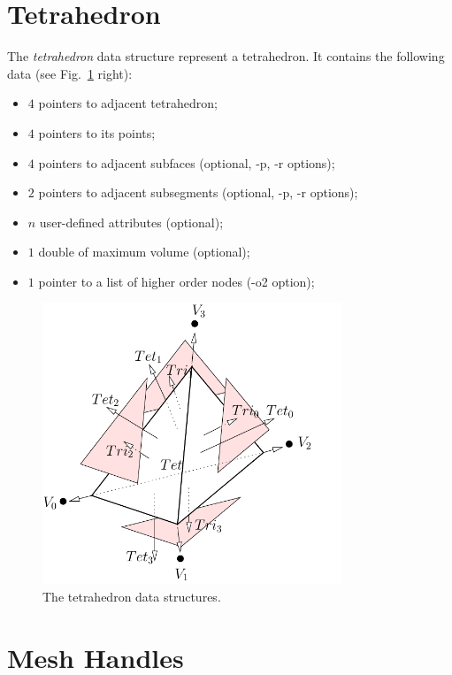 \section{Tetrahedron}

The {\it tetrahedron} data structure represent a tetrahedron. It contains the following data (see Fig.~\ref{fig:tetrahedron} right):
\begin{itemize}
\item $4$ pointers to adjacent tetrahedron;
\item $4$ pointers to its points;
\item $4$ pointers to adjacent subfaces (optional, -p, -r options);
\item $2$ pointers to adjacent subsegments (optional, -p, -r options);
\item $n$ user-defined attributes (optional);
\item $1$ double of maximum volume (optional);
\item $1$ pointer to a list of higher order nodes (-o2 option);
\end{itemize}

\begin{figure}
  \centering
  \includegraphics[width=0.8\textwidth]{../figs/tetrahedron-based}
\caption{The tetrahedron data structures.}
\label{fig:tetrahedron}
\end{figure}

\section{Mesh Handles}

